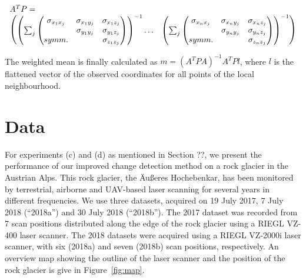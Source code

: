 \documentclass[preprint,12pt,3p]{elsarticle}
\begin{document}
\begin{equation}
\begin{array}{lr}
A^TP = \\
\begin{pmatrix}
 \left(\sum_j  \begin{pmatrix}
 \sigma_{x_1 x_j} & 
\sigma_{x_1 y_j} & 
 \sigma_{x_1 z_j} \\
 & 
\sigma_{y_1 y_j} & 
\sigma_{y_1 z_j} \\
symm. & 
 & 
\sigma_{z_1 z_j} \\
\end{pmatrix} \right ) ^{-1}
\dots
&
\left(\sum_j  \begin{pmatrix}
 \sigma_{x_n x_j} & 
\sigma_{x_n y_j} & 
 \sigma_{x_n z_j} \\
 & 
\sigma_{y_n y_j} & 
\sigma_{y_n z_j} \\
symm. & 
 & 
\sigma_{z_n z_j} \\
\end{pmatrix} \right ) ^{-1}
\end{pmatrix}
\end{array}
\\
\label{eq:ATP}    
\end{equation}

The weighted mean is finally calculated as $m = (A^TPA)^{-1} A^TPl$, where $l$ is the flattened vector of the observed coordinates for all points of the local neighbourhood.


\section{Data}

For experiments (c) and (d) as mentioned in Section ??, we present the performance of our improved change detection method on a rock glacier in the Austrian Alps. This rock glacier, the Äußeres Hochebenkar, has been monitored by terrestrial, airborne and UAV-based laser scanning for several years in different frequencies. We use three datasets, acquired on 19 July 2017, 7 July 2018 (“2018a”) and 30 July 2018 (“2018b”). The 2017 dataset was recorded from 7 scan positions distributed along the edge of the rock glacier using a RIEGL VZ-400 laser scanner. The 2018 datasets were acquired using a RIEGL VZ-2000i laser scanner, with six (2018a) and seven (2018b) scan positions, respectively. An overview map showing the outline of the laser scanner and the position of the rock glacier is give in Figure~\ref{fig:map}.
\end{document}
